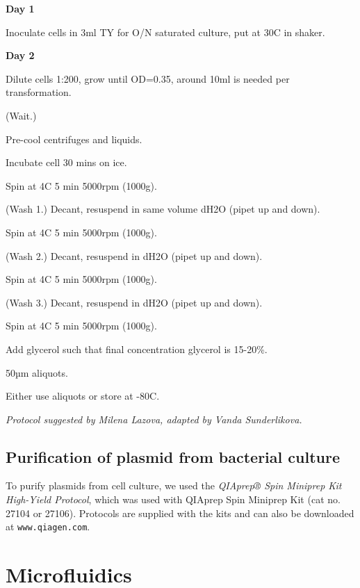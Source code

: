 \textbf{Day 1}
\begin{compactitem}
    \item Inoculate cells in 3ml TY for O/N saturated culture, put at 30C in shaker.
\end{compactitem}
\textbf{Day 2}
\begin{compactitem}    
    \item Dilute cells 1:200, grow until OD=0.35, around 10ml is needed per transformation.
    \item (Wait.)
    \item Pre-cool centrifuges and liquids.
    \item Incubate cell 30 mins on ice.
    \item Spin at 4C 5 min 5000rpm (1000g).
    \item (Wash 1.) Decant, resuspend in same volume dH2O (pipet up and down).
    \item Spin at 4C 5 min 5000rpm (1000g).
    \item (Wash 2.) Decant, resuspend in dH2O (pipet up and down).
    \item Spin at 4C 5 min 5000rpm (1000g).
    \item (Wash 3.) Decant, resuspend in dH2O (pipet up and down).
    \item Spin at 4C 5 min 5000rpm (1000g).    
    \item Add glycerol such that final concentration glycerol is 15-20\%.
    \item 50µm aliquots.
    \item Either use aliquots or store at -80C.
\end{compactitem}

\hfill \textit{Protocol suggested by Milena Lazova, adapted by Vanda Sunderlikova.}

\subsection*{Purification of plasmid from bacterial culture}
To purify plasmids from cell culture, we used the \textit{QIAprep® Spin Miniprep Kit High-Yield Protocol}, 
which was used with QIAprep Spin Miniprep Kit (cat no. 27104 or 27106). Protocols are supplied with the kits and can also be downloaded at \texttt{www.qiagen.com}.

\newpage

\section*{Microfluidics}

